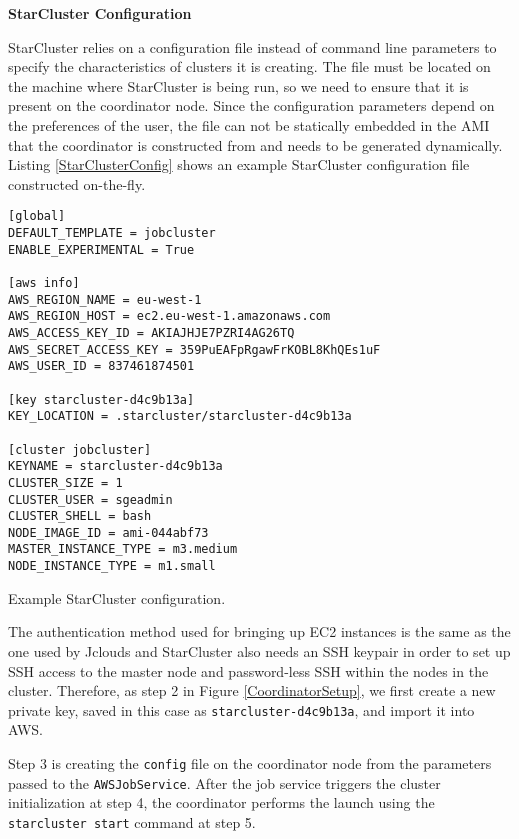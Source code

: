 \vspace{3mm}
\textbf{StarCluster Configuration}
\vspace{1mm}

StarCluster relies on a configuration file instead of command line parameters to specify the characteristics of clusters it is creating. The file must be located on the machine where StarCluster is being run, so we need to ensure that it is present on the coordinator node. Since the configuration parameters depend on the preferences of the user, the file can not be statically embedded in the AMI that the coordinator is constructed from and needs to be generated dynamically. Listing \ref{StarClusterConfig} shows an example StarCluster configuration file constructed on-the-fly.

\begin{listing}[h]
	\centering
	\begin{minipage}{12cm}
		\begin{verbatim}
[global]
DEFAULT_TEMPLATE = jobcluster
ENABLE_EXPERIMENTAL = True

[aws info]
AWS_REGION_NAME = eu-west-1
AWS_REGION_HOST = ec2.eu-west-1.amazonaws.com
AWS_ACCESS_KEY_ID = AKIAJHJE7PZRI4AG26TQ
AWS_SECRET_ACCESS_KEY = 359PuEAFpRgawFrKOBL8KhQEs1uF
AWS_USER_ID = 837461874501

[key starcluster-d4c9b13a]
KEY_LOCATION = .starcluster/starcluster-d4c9b13a

[cluster jobcluster]
KEYNAME = starcluster-d4c9b13a
CLUSTER_SIZE = 1
CLUSTER_USER = sgeadmin
CLUSTER_SHELL = bash
NODE_IMAGE_ID = ami-044abf73
MASTER_INSTANCE_TYPE = m3.medium
NODE_INSTANCE_TYPE = m1.small
		\end{verbatim}
	\end{minipage}
	\caption{Example StarCluster configuration.}
	\label{StarClusterConfig}
\end{listing}


The authentication method used for bringing up EC2 instances is the same as the one used by Jclouds and StarCluster also needs an SSH keypair in order to set up SSH access to the master node and password-less SSH within the nodes in the cluster. Therefore, as step 2 in Figure \ref{CoordinatorSetup}, we first create a new private key, saved in this case as \verb|starcluster-d4c9b13a|, and import it into AWS.

Step 3 is creating the \verb|config| file on the coordinator node from the parameters passed to the \verb|AWSJobService|. After the job service triggers the cluster initialization at step 4, the coordinator performs the launch using the \verb|starcluster start| command at step 5.

